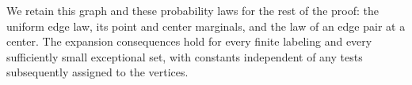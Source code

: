 We retain this graph and these probability laws for the rest of the
proof: the uniform edge law, its point and center marginals, and the
law of an edge pair at a center. The expansion consequences hold for every finite labeling
and every sufficiently small exceptional set, with constants independent
of any tests subsequently assigned to the vertices.
